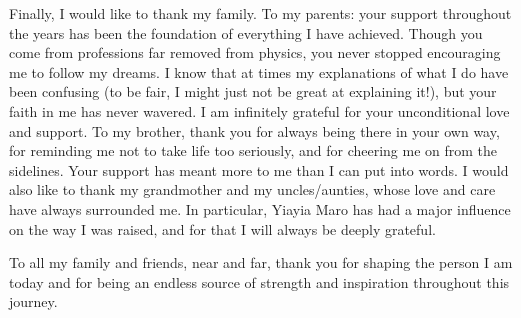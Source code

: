 \documentclass[12pt, a4paper, twoside]{report}
\begin{document}
Finally, I would like to thank my family. To my parents: your support throughout the years has been the foundation of everything I have achieved. Though you come from professions far removed from physics, you never stopped encouraging me to follow my dreams. I know that at times my explanations of what I do have been confusing (to be fair, I might just not be great at explaining it!), but your faith in me has never wavered. I am infinitely grateful for your unconditional love and support. To my brother, thank you for always being there in your own way, for reminding me not to take life too seriously, and for cheering me on from the sidelines. Your support has meant more to me than I can put into words. I would also like to thank my grandmother and my uncles/aunties, whose love and care have always surrounded me. In particular, Yiayia Maro has had a major influence on the way I was raised, and for that I will always be deeply grateful. 

To all my family and friends, near and far, thank you for shaping the person I am today and for being an endless source of strength and inspiration throughout this journey.  

\tableofcontents
\listoffigures
\listoftables

\clearpage
\end{document}
